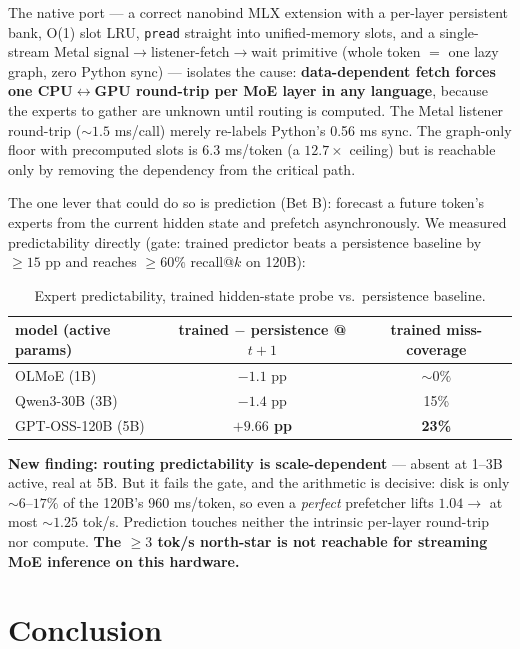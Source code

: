 \documentclass[11pt]{article}
\begin{document}
The native port --- a correct nanobind MLX extension with a per-layer persistent bank, O(1) slot LRU, \texttt{pread} straight into unified-memory slots, and a single-stream Metal signal$\to$listener-fetch$\to$wait primitive (whole token $=$ one lazy graph, zero Python sync) --- isolates the cause: \textbf{data-dependent fetch forces one CPU$\leftrightarrow$GPU round-trip per MoE layer in any language}, because the experts to gather are unknown until routing is computed. The Metal listener round-trip (${\sim}1.5$ ms/call) merely re-labels Python's 0.56 ms sync. The graph-only floor with precomputed slots is 6.3 ms/token (a $12.7\times$ ceiling) but is reachable only by removing the dependency from the critical path.

The one lever that could do so is prediction (Bet B): forecast a future token's experts from the current hidden state and prefetch asynchronously. We measured predictability directly (gate: trained predictor beats a persistence baseline by ${\ge}15$ pp and reaches ${\ge}60\%$ recall@$k$ on 120B):

\begin{table}[h]
\centering
\caption{Expert predictability, trained hidden-state probe vs.\ persistence baseline.}
\begin{tabular}{lcc}
\toprule
model (active params) & trained $-$ persistence @ $t{+}1$ & trained miss-coverage \\
\midrule
OLMoE (1B) & $-1.1$ pp & ${\sim}0\%$ \\
Qwen3-30B (3B) & $-1.4$ pp & 15\% \\
GPT-OSS-120B (5B) & \textbf{$+9.66$ pp} & \textbf{23\%} \\
\bottomrule
\end{tabular}
\end{table}

\textbf{New finding: routing predictability is scale-dependent} --- absent at 1--3B active, real at 5B. But it fails the gate, and the arithmetic is decisive: disk is only ${\sim}6$--$17\%$ of the 120B's 960 ms/token, so even a \emph{perfect} prefetcher lifts $1.04 \to$ at most ${\sim}1.25$ tok/s. Prediction touches neither the intrinsic per-layer round-trip nor compute. \textbf{The ${\ge}3$ tok/s north-star is not reachable for streaming MoE inference on this hardware.}

\section{Conclusion}
\end{document}
